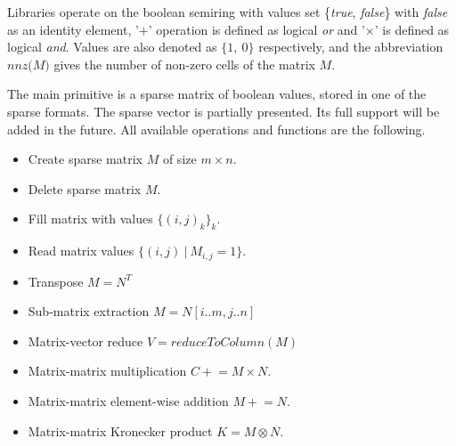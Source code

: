 Libraries operate on the boolean semiring with values set \{\textit{true}, \textit{false}\} with \textit{false} as an identity element, '$+$' operation is defined as logical \textit{or} and '$\times$' is defined as logical \textit{and}.
Values are also denoted as $\{1,~0\}$ respectively, and the abbreviation $\textit{nnz(M)}$ gives the number of non-zero cells of the matrix $M$.

The main primitive is a sparse matrix of boolean values, stored in one of the sparse formats.
The sparse vector is partially presented. 
Its full support will be added in the future. 
All available operations and functions are the following.


\begin{itemize}
    \item Create sparse matrix $M$ of size $m \times n$.
    \item Delete sparse matrix $M$.
    \item Fill matrix with values $\{(i,j)_k\}_k$.
    \item Read matrix values $\{(i, j)~|~M_{i,j} = 1\}$.
    \item Transpose $M = N^T$
    \item Sub-matrix extraction $M = N[i..m, j..n]$
    \item Matrix-vector reduce $V = \textit{reduceToColumn}(M)$
    \item Matrix-matrix multiplication $C \mathrel{+}= M \times N$.
    \item Matrix-matrix element-wise addition $M \mathrel{+}= N$.
    \item Matrix-matrix Kronecker product $K = M \otimes N$.
\end{itemize}